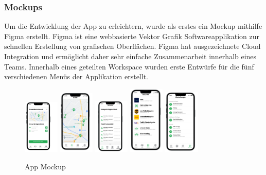 \subsubsection{Mockups}
Um die Entwicklung der App zu erleichtern, wurde als erstes ein Mockup mithilfe Figma erstellt. Figma ist eine webbasierte Vektor Grafik Softwareapplikation zur schnellen Erstellung von grafischen Oberflächen. Figma hat ausgezeichnete Cloud Integration und ermöglicht daher sehr einfache Zusammenarbeit innerhalb eines Teams. Innerhalb eines geteilten Workspace wurden erste Entwürfe für die fünf verschiedenen Menüs der Applikation erstellt.

\begin{figure}[h]
  \centering
  \includegraphics[width=0.15\textwidth]{images/app_mock_tower}
  \includegraphics[width=0.15\textwidth]{images/app_mock_map}
  \includegraphics[width=0.15\textwidth]{images/app_mock_objects}
  \includegraphics[width=0.15\textwidth]{images/app_mock_services}
  \includegraphics[width=0.15\textwidth]{images/app_mock_settings}
  \caption{App Mockup}
  \label{fig:app_mockup}
\end{figure}